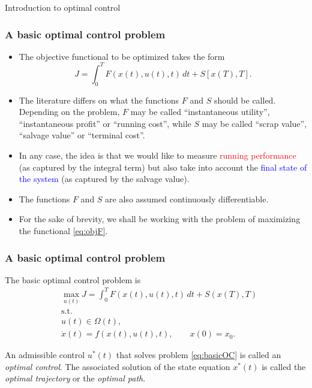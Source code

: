 \documentclass[10pt]{beamer}
\theoremstyle{definition}
\begin{document}
\begin{section}{Introduction to optimal control}
\begin{frame}[fragile]
\frametitle{A basic optimal control problem}
\begin{itemize}\itemsep1em
\item The objective functional to be optimized takes the form \begin{equation}
J = \int_{0}^{T}F(x(t),u(t),t)\,dt + S[x(T),T].
\label{eq:objF}
\end{equation}
\item The literature differs on what the functions $ F $ and $ S $ should be called. Depending on the problem, $ F $ may be called ``instantaneous utility'', ``instantaneous profit'' or ``running cost'', while $ S $ may be called ``scrap value'', ``salvage value'' or ``terminal cost''.
\item In any case, the idea is that we would like to measure \textcolor{red}{running performance} (as captured by the integral term) but also take into account the \textcolor{blue}{final state of the system} (as captured by the salvage value).
\item The functions $ F $ and $ S $ are also assumed continuously differentiable.
\item For the sake of brevity, we shall be working with the problem of maximizing the functional \eqref{eq:objF}.
\end{itemize}
\end{frame}

\begin{frame}[fragile]
\frametitle{A basic optimal control problem}
The basic optimal control problem is 
\begin{equation}
\begin{split}
& \max_{u(t)} J = \int_{0}^{T}F(x(t),u(t),t)\,dt + S(x(T),T) \\
&\text{s.t.}\\
& u(t)\in \Omega(t) ,\\
& \dot{x}(t)=f(x(t),u(t),t),\qquad x(0)=x_0.
\end{split}
\label{eq:basicOC}
\end{equation}\bigskip

An admissible control $ u^*(t) $ that solves problem \eqref{eq:basicOC} is called an \emph{optimal control}. The associated solution of the state equation $ x^*(t) $ is called the \emph{optimal trajectory} or the \emph{optimal path}.
\end{frame}


\end{section}
\end{document}
